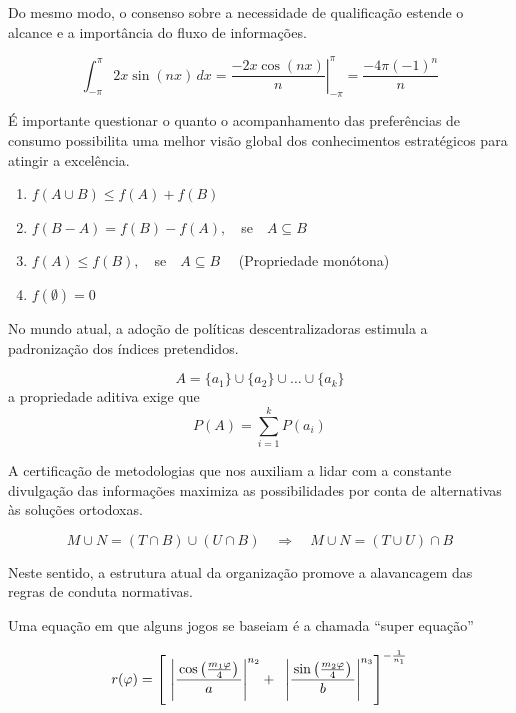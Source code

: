 \begin{apendicesenv}
    Do mesmo modo, o consenso sobre a necessidade de qualificação estende o alcance
    e a importância do fluxo de informações.

    \[
        \int_{-\pi}^{\pi} 2x\sin(nx)\,dx
        = \left.
        \frac{-2x\cos(nx)}{n}
        \right|_{-\pi}^{\pi}
        = \frac{-4\pi(-1)^n}{n}
    \]

    É importante questionar o quanto o
    acompanhamento das preferências de consumo possibilita uma melhor visão global
    dos conhecimentos estratégicos para atingir a excelência.

    \begin{enumerate}[label=\alph*)]
        \item $f(A\cup B)\leq f(A)+f(B)$
        \item $f(B-A)=f(B)-f(A), \quad $se$\quad A\subseteq B$
        \item $f(A)\leq f(B), \quad $se$\quad A\subseteq B \quad$ (Propriedade monótona)
        \item $f(\emptyset)=0$
    \end{enumerate}

    No mundo atual, a
    adoção de políticas descentralizadoras estimula a padronização dos índices
    pretendidos.

    \[
        A = \{a_{1}\} \cup \{a_{2}\} \cup \dots \cup \{a_{k} \}
    \]
    a propriedade aditiva exige que
    \[
        P(A) = \sum_{i=1}^{k} P({a_{i}})
    \]

    A certificação de metodologias que nos auxiliam a lidar com a
    constante divulgação das informações maximiza as possibilidades por conta de
    alternativas às soluções ortodoxas.

    \[
        M \cup N = (T \cap B) \cup (U \cap B)
        \quad
        \Rightarrow
        \quad
        M \cup N = (T \cup U) \cap B
    \]

    Neste sentido, a estrutura atual da organização promove a alavancagem das regras
    de conduta normativas.

    Uma equação em que alguns jogos se baseiam é a chamada ``super equação''

    \[
        r( \varphi )=
        \left [\,
        \vphantom{\begin{array}{c}1\\2\\3\\\end{array}}
        \left|
        \frac{\,\cos\left( \frac{m_1\varphi }{4} \right)\,}{a}
        \right|^{n_2} + \;\;
        \left|
        \frac{\,\sin\left( \frac{m_2\varphi }{4} \right)\,}{b}
        \right|^{n_3}
        \right]^{-\frac{1}{n_1}}
    \]


\end{apendicesenv}
